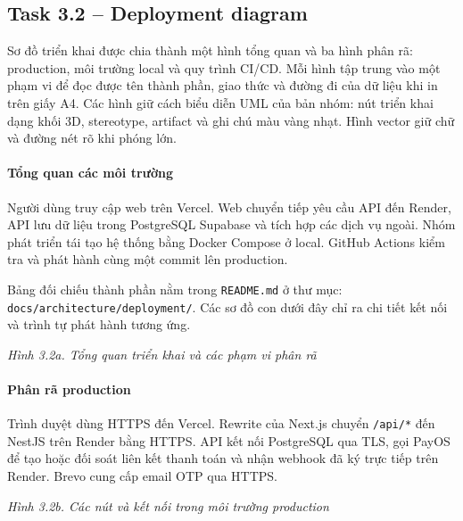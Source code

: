 \subsection{Task 3.2 -- Deployment diagram}

Sơ đồ triển khai được chia thành một hình tổng quan và ba hình phân rã:
production, môi trường local và quy trình CI/CD. Mỗi hình tập trung vào một
phạm vi để đọc được tên thành phần, giao thức và đường đi của dữ liệu khi in
trên giấy A4. Các hình giữ cách biểu diễn UML của bản nhóm: nút triển khai
dạng khối 3D, stereotype, artifact và ghi chú màu vàng nhạt. Hình vector
giữ chữ và đường nét rõ khi phóng lớn.

\paragraph{Tổng quan các môi trường}
Người dùng truy cập web trên Vercel. Web chuyển tiếp yêu cầu API đến Render,
API lưu dữ liệu trong PostgreSQL Supabase và tích hợp các dịch vụ ngoài.
Nhóm phát triển tái tạo hệ thống bằng Docker Compose ở local. GitHub Actions
kiểm tra và phát hành cùng một commit lên production.

Bảng đối chiếu thành phần nằm trong \nolinkurl{README.md} ở thư mục:\\
\nolinkurl{docs/architecture/deployment/}. Các sơ đồ con dưới đây
chỉ ra chi tiết kết nối và trình tự phát hành tương ứng.

\begin{reportfigure}

\par\small\itshape Hình 3.2a. Tổng quan triển khai và các phạm vi phân rã
\end{reportfigure}

\paragraph{Phân rã production}
Trình duyệt dùng HTTPS đến Vercel. Rewrite của Next.js chuyển
\nolinkurl{/api/*} đến NestJS trên Render bằng HTTPS. API kết nối PostgreSQL
qua TLS, gọi PayOS để tạo hoặc đối soát liên kết thanh toán và nhận webhook
đã ký trực tiếp trên Render. Brevo cung cấp email OTP qua HTTPS.

\begin{reportfigure}

\par\small\itshape Hình 3.2b. Các nút và kết nối trong môi trường production
\end{reportfigure}

